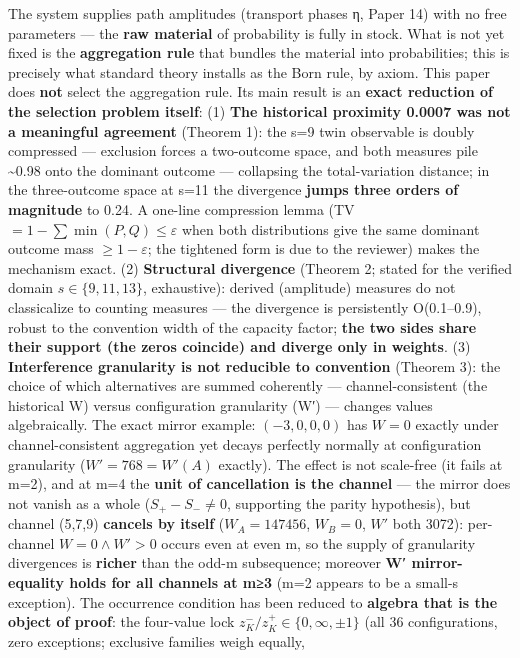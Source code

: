 \documentclass[
]{article}
\begin{document}
The system supplies path amplitudes (transport phases η, Paper 14) with
no free parameters --- the \textbf{raw material} of probability is fully
in stock. What is not yet fixed is the \textbf{aggregation rule} that
bundles the material into probabilities; this is precisely what standard
theory installs as the Born rule, by axiom. This paper does \textbf{not}
select the aggregation rule. Its main result is an \textbf{exact
reduction of the selection problem itself}: (1) \textbf{The historical
proximity 0.0007 was not a meaningful agreement} (Theorem 1): the s=9
twin observable is doubly compressed --- exclusion forces a two-outcome
space, and both measures pile \textasciitilde0.98 onto the dominant
outcome --- collapsing the total-variation distance; in the
three-outcome space at s=11 the divergence \textbf{jumps three orders of
magnitude} to 0.24. A one-line compression lemma (TV
\(=1-\sum\min(P,Q)\le\varepsilon\) when both distributions give the same
dominant outcome mass \(\ge1-\varepsilon\); the tightened form is due to
the reviewer) makes the mechanism exact. (2) \textbf{Structural
divergence} (Theorem 2; stated for the verified domain
\(s\in\{9,11,13\}\), exhaustive): derived (amplitude) measures do not
classicalize to counting measures --- the divergence is persistently
O(0.1--0.9), robust to the convention width of the capacity factor;
\textbf{the two sides share their support (the zeros coincide) and
diverge only in weights}. (3) \textbf{Interference granularity is not
reducible to convention} (Theorem 3): the choice of which alternatives
are summed coherently --- channel-consistent (the historical W) versus
configuration granularity (W′) --- changes values algebraically. The
exact mirror example: \((-3,0,0,0)\) has \(W=0\) exactly under
channel-consistent aggregation yet decays perfectly normally at
configuration granularity (\(W'=768=W'(A)\) exactly). The effect is not
scale-free (it fails at m=2), and at m=4 the \textbf{unit of
cancellation is the channel} --- the mirror does not vanish as a whole
(\(S_+-S_-\neq0\), supporting the parity hypothesis), but channel
(5,7,9) \textbf{cancels by itself} (\(W_A=147456\), \(W_B=0\), \(W'\)
both 3072): per-channel \(W=0\wedge W'>0\) occurs even at even m, so the
supply of granularity divergences is \textbf{richer} than the odd-m
subsequence; moreover \textbf{W′ mirror-equality holds for all channels
at m≥3} (m=2 appears to be a small-s exception). The occurrence
condition has been reduced to \textbf{algebra that is the object of
proof}: the four-value lock \(z^-_K/z^+_K\in\{0,\infty,\pm1\}\) (all 36
configurations, zero exceptions; exclusive families weigh equally,
\end{document}
